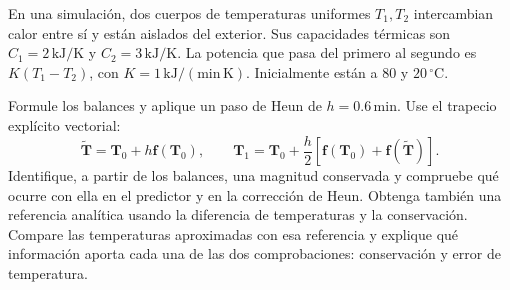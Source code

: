 En una simulación, dos cuerpos de temperaturas uniformes \(T_1,T_2\) intercambian calor entre sí y están aislados del exterior. Sus capacidades térmicas son \(C_1=2\,\mathrm{kJ/K}\) y \(C_2=3\,\mathrm{kJ/K}\). La potencia que pasa del primero al segundo es \(K(T_1-T_2)\), con \(K=1\,\mathrm{kJ/(min\,K)}\). Inicialmente están a \(80\) y \(20\,{}^\circ\mathrm C\).

Formule los balances y aplique un paso de Heun de \(h=0.6\,\mathrm{min}\). Use el trapecio explícito vectorial:
\[
\widetilde{\mathbf T}=\mathbf T_0+h\mathbf f(\mathbf T_0),\qquad
\mathbf T_1=\mathbf T_0+\frac h2[\mathbf f(\mathbf T_0)+\mathbf f(\widetilde{\mathbf T})].
\]
Identifique, a partir de los balances, una magnitud conservada y compruebe qué ocurre con ella en el predictor y en la corrección de Heun. Obtenga también una referencia analítica usando la diferencia de temperaturas y la conservación. Compare las temperaturas aproximadas con esa referencia y explique qué información aporta cada una de las dos comprobaciones: conservación y error de temperatura.
